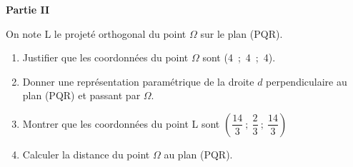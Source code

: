\documentclass[10pt]{article}
\begin{document}
\bigskip

\textbf{Partie II}

\medskip

On note L le projeté orthogonal du point $\Omega$ sur le plan (PQR).

\medskip

\begin{enumerate}
\item Justifier que les coordonnées du point $\Omega$ sont (4~;~4~;~4).
\item Donner une représentation paramétrique de la droite $d$ perpendiculaire au plan (PQR) et passant par $\Omega$.
\item Montrer que les coordonnées du point L sont $\left(\dfrac{14}{3}~;~ \dfrac{2}{3}~;~\dfrac{14}{3}\right)$
\item Calculer la distance du point $\Omega$ au plan (PQR).
\end{enumerate}


\bigskip
\end{document}
